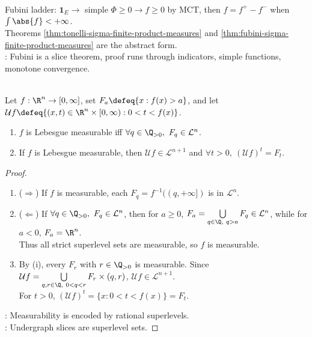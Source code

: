\begin{perspective} \label{per:fubini-proof-ladder} \\
Fubini ladder: $\mathbf{1}_E\to$ simple $\Phi\geq0\to f\geq0$ by MCT, then $f=f^+-f^-$ when $\int\abs{f}<+\infty$.\\
Theorems \ref{thm:tonelli-sigma-finite-product-measures} and \ref{thm:fubini-sigma-finite-product-measures} are the abstract form.\\
: Fubini is a slice theorem, proof runs through indicators, simple functions, monotone convergence.
\end{perspective}

\begin{proposition} \label{prop:undergraph-measurability-level-sets} \\
Let $f:\R^n\to[0,\infty]$, set $F_a\defeq\{x:f(x)>a\}$, and let $\mathcal{U}f\defeq\{(x,t)\in\R^n\times[0,\infty):0<t<f(x)\}$.
\begin{enumerate}[label=(\roman*)]
\setlength{\itemsep}{0pt}
\item $f$ is Lebesgue measurable iff $\forall q\in\Q_{>0},\ F_q\in\mathcal{L}^n$.
\item If $f$ is Lebesgue measurable, then $\mathcal{U}f\in\mathcal{L}^{n+1}$ and $\forall t>0,\ (\mathcal{U}f)^t=F_t$.
\end{enumerate}
\begin{proof}
\begin{enumerate}[label=(\roman*)]
\setlength{\itemsep}{0pt}
\item[$(i)$] ($\Rightarrow$) If $f$ is measurable, each $F_q=f^{-1}((q,+\infty])$ is in $\mathcal L^n$.\\
\item[$(i)$] ($\Leftarrow$) If $\forall q\in\Q_{>0},\ F_q\in\mathcal L^n$, then for $a\geq0$, $F_a=\bigcup\limits_{q\in\Q,\ q>a}F_q\in\mathcal L^n$, while for $a<0$, $F_a=\R^n$.\\
Thus all strict superlevel sets are measurable, so $f$ is measurable.
\item[$(ii)$] By (i), every $F_r$ with $r\in\Q_{>0}$ is measurable. Since $\mathcal{U}f=\bigcup\limits_{q,r\in\Q,\ 0<q<r}F_r\times(q,r)$, $\mathcal{U}f\in\mathcal L^{n+1}$.\\
For $t>0$, $(\mathcal{U}f)^t=\{x:0<t<f(x)\}=F_t$.
\end{enumerate}
: Measurability is encoded by rational superlevels.\\
: Undergraph slices are superlevel sets.
\end{proof}
\end{proposition}

